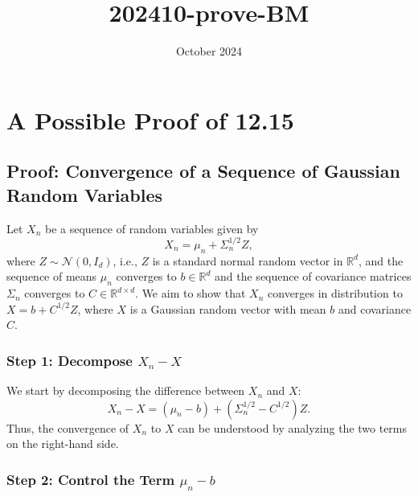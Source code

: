 \documentclass{article}
\begin{document}
\newtheorem{theorem}{Theorem}
\newtheorem{definition}{Definition}



\title{202410-prove-BM}
\date{October 2024}



\maketitle

\section{A Possible Proof of 12.15}



\subsection*{Proof: Convergence of a Sequence of Gaussian Random Variables}

Let \( X_n \) be a sequence of random variables given by
\[
X_n = \mu_n + \Sigma_n^{1/2} Z,
\]
where \( Z \sim \mathcal{N}(0, I_d) \), i.e., \( Z \) is a standard normal random vector in \( \mathbb{R}^d \), and the sequence of means \( \mu_n \) converges to \( b \in \mathbb{R}^d \) and the sequence of covariance matrices \( \Sigma_n \) converges to \( C \in \mathbb{R}^{d \times d} \). We aim to show that \( X_n \) converges in distribution to \( X = b + C^{1/2} Z \), where \( X \) is a Gaussian random vector with mean \( b \) and covariance \( C \).

\subsubsection*{Step 1: Decompose \( X_n - X \)}

We start by decomposing the difference between \( X_n \) and \( X \):
\[
X_n - X = (\mu_n - b) + (\Sigma_n^{1/2} - C^{1/2}) Z.
\]
Thus, the convergence of \( X_n \) to \( X \) can be understood by analyzing the two terms on the right-hand side.

\subsubsection*{Step 2: Control the Term \( \mu_n - b \)}
\end{document}

